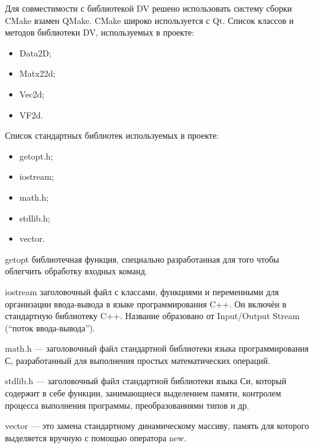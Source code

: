 Для совместимости с библиотекой DV решено использовать систему сборки CMake взамен QMake. CMake широко используется с Qt.
Список классов и методов библиотеки DV, используемых в проекте:
\begin{itemize}
\item Data2D;
\item Matx22d;
\item Vec2d;
\item VF2d.
\end{itemize}

Список стандартных библиотек используемых в проекте:

\begin{itemize}
\item getopt.h;
\item iostream;
\item math.h;
\item stdlib.h;
\item vector.
\end{itemize}

getopt библиотечная функция, специально разработанная для того чтобы облегчить обработку входных команд.

iostream заголовочный файл с классами, функциями и переменными для организации ввода-вывода в языке программирования C++. Он включён в стандартную библиотеку C++. Название образовано от Input/Output Stream (``поток ввода-вывода'').

math.h — заголовочный файл стандартной библиотеки языка программирования С, разработанный для выполнения простых математических операций.

stdlib.h — заголовочный файл стандартной библиотеки языка Си, который содержит в себе функции, занимающиеся выделением памяти, контролем процесса выполнения программы, преобразованиями типов и др.

vector — это замена стандартному динамическому массиву, память для которого выделяется вручную с помощью оператора new.
